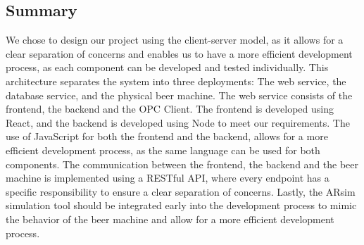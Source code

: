\subsection{Summary}
We chose to design our project using the client-server model, as it allows for a clear separation of concerns and enables us to have a more efficient development process, as each component can be developed and tested individually.\newline
This architecture separates the system into three deployments: The web service, the database service, and the physical beer machine. \newline
The web service consists of the frontend, the backend and the OPC Client. The frontend is developed using React, and the backend is developed using Node to meet our requirements. The use of JavaScript for both the frontend and the backend, allows for a more efficient development process, as the same language can be used for both components. \newline
The communication between the frontend, the backend and the beer machine is implemented using a RESTful API, where every endpoint has a specific responsibility to ensure a clear separation of concerns.\newline
Lastly, the ARsim simulation tool should be integrated early into the development process to mimic the behavior of the beer machine and allow for a more efficient development process.